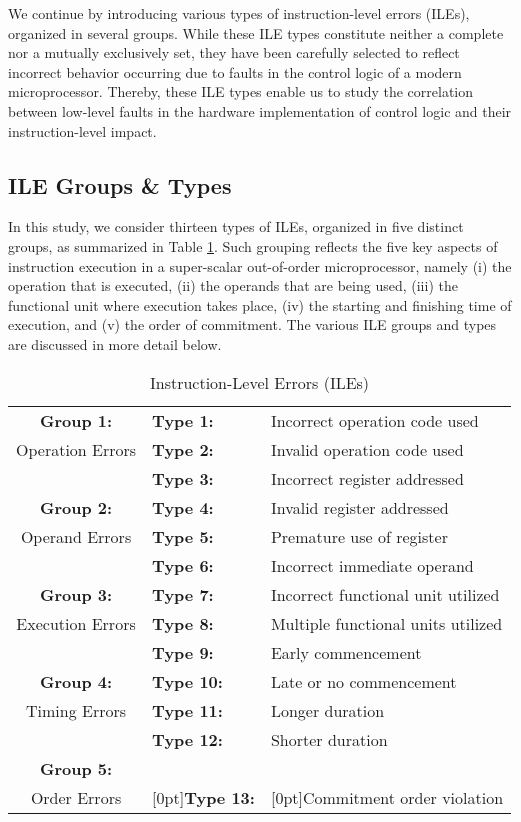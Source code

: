 \documentclass[12pt]{yalephd}
\begin{document}
We continue by introducing various types of instruction-level errors (ILEs), organized in several groups. While these ILE types constitute neither a complete nor a mutually exclusively set, they have been carefully selected to reflect incorrect behavior occurring due to faults in the control logic of a modern microprocessor. Thereby, these ILE types enable us to study the correlation between low-level faults in the hardware implementation of control logic and their instruction-level impact.


\subsection{ILE Groups \& Types}\label{sC2ILE_Types}

In this study, we consider thirteen types of ILEs, organized in five distinct groups, as summarized in Table \ref{sC2ILE_Table}. Such grouping reflects the five key aspects of instruction execution in a super-scalar out-of-order microprocessor, namely (i) the operation that is executed, (ii) the operands that are being used, (iii) the functional unit where execution takes place, (iv) the starting and finishing time of execution, and (v) the order of commitment. The various ILE groups and types are discussed in more detail below.


\begin{table}[!ht]
\caption{Instruction-Level Errors (ILEs)}\label{sC2ILE_Table}
\begin{center}
\begin{tabular}{||c|ll||}
\hline
\hline
{\bf Group 1:} & {\bf Type 1:} & Incorrect operation code used\\
\cline{2-3}
Operation Errors & {\bf Type 2:} & Invalid operation code used\\
\hline
\hline
& {\bf Type 3:} & Incorrect register addressed\\
\cline{2-3}
{\bf Group 2:} & {\bf Type 4:} & Invalid register addressed\\
\cline{2-3}
Operand Errors & {\bf Type 5:} & Premature use of register\\
\cline{2-3}
& {\bf Type 6:} & Incorrect immediate operand\\
\hline
\hline
{\bf Group 3:} & {\bf Type 7:} & Incorrect functional unit utilized\\
\cline{2-3}
Execution Errors & {\bf Type 8:} & Multiple functional units utilized\\
\hline
\hline
& {\bf Type 9:} & Early commencement\\
\cline{2-3}
{\bf Group 4:} & {\bf Type 10:} & Late or no commencement\\
\cline{2-3}
Timing Errors& {\bf Type 11:} & Longer duration\\
\cline{2-3}
& {\bf Type 12:} & Shorter duration\\
\hline
\hline
{\bf Group 5:}  & &\\
Order Errors & \raisebox{1.2ex}[0pt]{\bf Type 13:} & \raisebox{1.2ex}[0pt]{Commitment order violation}\\
\hline
\hline
\end{tabular}
\end{center}
\end{table}
\end{document}
